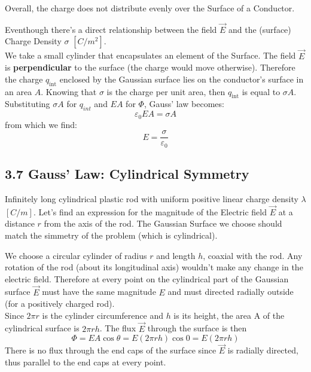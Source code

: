 \documentclass[12pt, a4paper]{article}
\begin{document}
		Overall, the charge does not distribute evenly over the Surface of a Conductor. 
	
		Eventhough there's a direct relationship between the field $\vec{E}$ and the (surface) Charge Density $\sigma$ $[ C/m^2 ]$.\\
		We take a small cylinder that encapsulates an element of the Surface. The field $\vec{E}$ is \textbf{perpendicular} to the surface (the charge would move otherwise). Therefore the charge $q_{\text{int}}$ enclosed by the Gaussian surface lies on the conductor's surface in an area $A$. Knowing that $\sigma$ is the charge per unit area, then $q_{\text{int}}$ is equal to $\sigma A$. Substituting $\sigma A$ for $q_{int}$ and $EA$ for $\Phi$, Gauss' law becomes:
		\begin{equation*}
			\varepsilon_0 EA = \sigma A 
			\tag{3-9}
		\end{equation*}
		from which we find:
		\begin{equation*}
			E = \frac{\sigma}{\varepsilon_0}
			\tag{Conducting Surface, 3-10}
		\end{equation*}
	
		\newpage
	
	
	
		\subsection*{3.7 Gauss' Law: Cylindrical Symmetry}
		
		Infinitely long cylindrical plastic rod with uniform positive linear charge density $\lambda$ $[ C/m ]$. Let's find an expression for the magnitude of the Electric field $\vec{E}$ at a distance $r$ from the axis of the rod. The Gaussian Surface we choose should match the simmetry of the problem (which is cylindrical).
		
		We choose a circular cylinder of radius $r$ and length $h$, coaxial with the rod. Any rotation of the rod (about its longitudinal axis) wouldn't make any change in the electric field. Therefore at every point on the cylindrical part of the Gaussian surface $\vec{E}$ must have the same magnitude $E$ and must directed radially outside (for a positively charged rod). \\
		
		Since $2\pi r$ is the cylinder circumference and $h$ is its height, the area A of the cylindrical surface is $2\pi rh$. The flux $\vec{E}$ through the surface is then
		\begin{equation*}
			\Phi = EA\cos\theta = E(2\pi rh)\cos0 = E(2\pi rh)
		\end{equation*}
		There is no flux through the end caps of the surface since $\vec{E}$ is radially directed, thus parallel to the end caps at every point.
		
\end{document}
